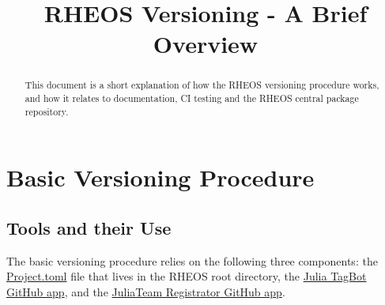 \documentclass[]{article}
\title{RHEOS Versioning - A Brief Overview}
\author{}
\newcommand{\link}[2]{{\color{blue}\href{#1}{#2}}}
\begin{document}
	
\date{}
\maketitle

\begin{abstract}
This document is a short explanation of how the RHEOS versioning procedure works, and how it relates to documentation, CI testing and the RHEOS central package repository.
\end{abstract}

\section{Basic Versioning Procedure}
\subsection{Tools and their Use}
The basic versioning procedure relies on the following three components: the \link{https://github.com/JuliaRheology/RHEOS.jl/blob/master/Project.toml}{Project.toml} file that lives in the RHEOS root directory, the \link{https://github.com/JuliaRegistries/TagBot}{Julia TagBot GitHub app}, and the \link{https://github.com/JuliaRegistries/Registrator.jl}{JuliaTeam Registrator GitHub app}.\\
\end{document}
